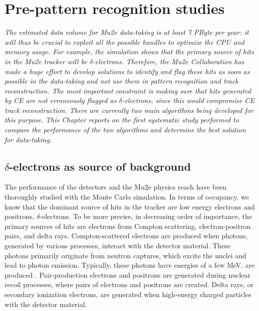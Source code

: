 \chapter{Pre-pattern recognition studies}\label{delta}
\textit{
The estimated data volume for Mu2e data-taking 
is at least 7 PByte per year: it will thus be crucial to 
exploit all the possible handles to optimize 
the CPU and memory usage. For example, the simulation 
shows that the primary source of hits in the 
Mu2e tracker will be $\delta$-electrons. 
Therefore, the Mu2e Collaboration has made 
a huge effort to develop solutions to identify 
and flag these hits as soon as possible in the 
data-taking and not use them in pattern 
recognition and track reconstruction. 
The most important constraint is 
making sure that hits generated by CE are 
not erroneously flagged as $\delta$-electrons, 
since this would compromise CE track reconstruction. 
There are currently two main algorithms being 
developed for this purpose. This Chapter reports 
on the first systematic study performed to compare 
the performance of the two algorithms and determine 
the best solution for data-taking. }



\section{$\delta$-electrons as source of background}

The performance of the detectors and the Mu2e 
physics reach have been thoroughly studied with 
the Monte Carlo simulation. In terms of 
occupancy, we know that the dominant 
source of hits in the tracker are low energy electrons and positrons,
$\delta$-electrons. To be more precise, in 
decreasing order of importance, the primary sources of hits are 
electrons from Compton scattering, electron-positron pairs, 
and delta rays. Compton-scattered electrons are produced 
when photons, generated by various processes, 
interact with the detector material. These photons primarily 
originate from neutron captures, which excite the 
nuclei and lead  
to  photon emission. Typically, 
these photons have 
energies of a few MeV.  are 
produced 
. Pair-production 
electrons and positrons are 
generated during nuclear recoil 
processes, where pairs of electrons 
and positrons are created.
Delta rays, 
or secondary ionization electrons, 
are generated when high-energy 
charged particles  with the detector material.


